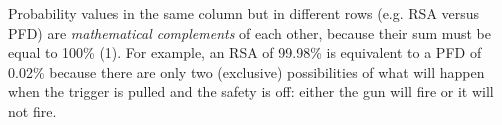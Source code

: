 Probability values in the same column but in different rows (e.g. RSA versus PFD) are {\it mathematical complements} of each other, because their sum must be equal to 100\% (1).  For example, an RSA of 99.98\% is equivalent to a PFD of 0.02\% because there are only two (exclusive) possibilities of what will happen when the trigger is pulled and the safety is off: either the gun will fire or it will not fire.
 










